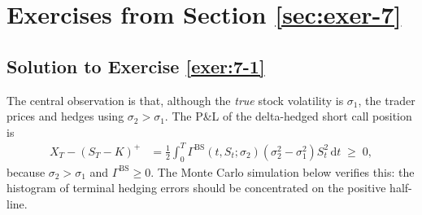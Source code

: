 \documentclass[12pt]{book}
\numberwithin{equation}{chapter}
\theoremstyle{plain}
\numberwithin{theorem}{section}
\theoremstyle{definition}
\numberwithin{exercise}{chapter}
\newcommand{\<}{\langle}
\renewcommand{\>}{\rangle}
\renewcommand{\(}{\left(}
\renewcommand{\)}{\right)}
\renewcommand{\[}{\left[}
\renewcommand{\]}{\right]}
\newcommand\sig{\sigma}
\newcommand\Gam{\Gamma}
\newcommand\dd{\mathrm{d}}
\newcommand\BS{\textrm{BS}}
\theoremstyle{definition}
\numberwithin{question}{section}
\begin{document}

\clearpage
\section{Exercises from Section \ref{sec:exer-7}}

\subsection*{Solution to Exercise \ref{exer:7-1}}
The central observation is that, although the \emph{true} stock volatility is $\sig_1$, the trader prices and hedges using $\sig_2 > \sig_1$.  The P\&L of the delta-hedged short call position is
\begin{align}
X_T - (S_T - K)^+
  &= \frac{1}{2}\int_0^T \Gam^\BS(t,S_t;\sig_2)(\sig_2^2 - \sig_1^2) S_t^2\, \dd t \;\geq\; 0,
\end{align}
because $\sig_2 > \sig_1$ and $\Gam^\BS \geq 0$.  The Monte Carlo simulation below verifies this: the histogram of terminal hedging errors should be concentrated on the positive half-line.
\end{document}
